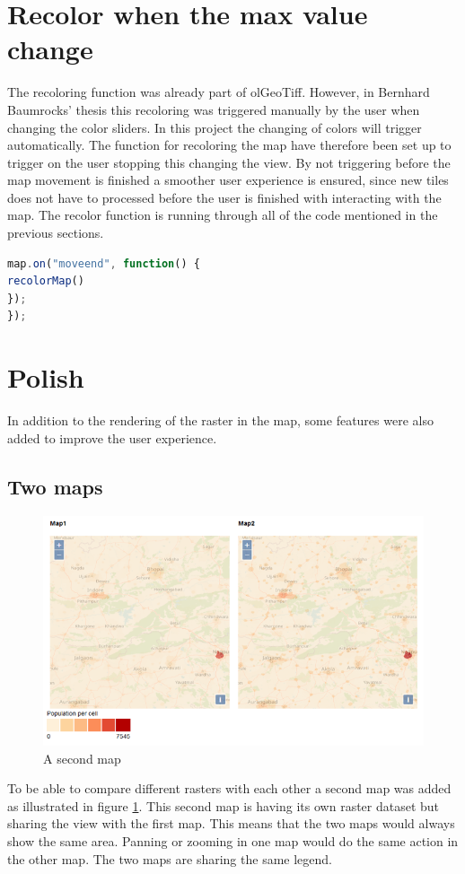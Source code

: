 \section{Recolor when the max value change}

The recoloring function was already part of olGeoTiff. However, in Bernhard Baumrocks’ thesis this recoloring was triggered manually by the user when changing the color sliders. In this project the changing of colors will trigger automatically. The function for recoloring the map have therefore been set up to trigger on the user stopping this changing the view. By not triggering before the map movement is finished a smoother user experience is ensured, since new tiles does not have to processed before the user is finished with interacting with the map. The recolor function is running through all of the code mentioned in the previous sections. 

\begin{lstlisting}[language=JavaScript, caption={The JavaScript in the project}, label= VoresJS,escapechar=|]
map.on("moveend", function() {
recolorMap()
});
});
\end{lstlisting}
\section{Polish}
In addition to the rendering of the raster in the map, some features were also added to improve the user experience.


\subsection{Two maps}

\begin{figure} [H]
	\centering
	\includegraphics[width=.8\textwidth]{Pictures/DualMaps}
	\caption{A second map}
	\label{DualMaps}
\end{figure}
To be able to compare different rasters with each other a second map was added as illustrated in figure \ref{DualMaps}. This second map is having its own raster dataset but sharing the view with the first map. This means that the two maps would always show the same area. Panning or zooming in one map would do the same action in the other map. The two maps are sharing the same legend. 

